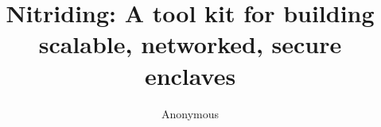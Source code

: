 \documentclass[letterpaper,twocolumn,10pt]{article}
\begin{document}
\title{\Large \bf Nitriding: A tool kit for building\\scalable, networked, secure enclaves}

\author{Anonymous}

\maketitle












\printbibliography
\balance

\appendix


\end{document}
